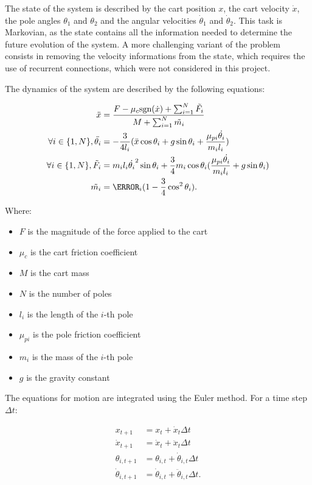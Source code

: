 The state of the system is described by the cart position $x$, the cart velocity $\dot{x}$, the pole angles $\theta_1$ and $\theta_2$ and the angular velocities $\dot{\theta}_1$ and $\dot{\theta}_2$.
This task is Markovian, as the state contains all the information needed to determine the future evolution of the system.
A more challenging variant of the problem consists in removing the velocity informations from the state, which requires the use of recurrent connections, which were not considered
in this project.

The dynamics of the system are described by the following equations:

\[
    \begin{aligned}
        \ddot{x} &= \frac{F - \mu_c \text{sgn}(\dot{x}) + \sum_{i = 1}^N \tilde{F_i}}{M + \sum_{i = 1}^N \tilde{m_i}} \\
        \forall i \in \{1, N\}, \ddot{\theta_i} &= - \frac{3}{4 l_i} (\ddot{x} \cos \theta_i + g \sin \theta_i + \frac{\mu_{pi} \dot{\theta_i}}{m_i l_i})\\
        \forall i \in \{1, N\}, \tilde{F_i} &= m_i l_i \dot{\theta_i}^2 \sin \theta_i + \frac{3}{4} m_i \cos \theta_i (\frac{\mu_{pi} \dot{\theta_i}}{m_i l_i} + g \sin \theta_i) \\
        \tilde{m_i} &= \m_i (1 - \frac{3}{4} \cos^2 \theta_i). \\
    \end{aligned}
\]

Where:

\begin{itemize}
    \item $F$ is the magnitude of the force applied to the cart
    \item $\mu_c$ is the cart friction coefficient
    \item $M$ is the cart mass
    \item $N$ is the number of poles
    \item $l_i$ is the length of the $i$-th pole
    \item $\mu_{pi}$ is the pole friction coefficient
    \item $m_i$ is the mass of the $i$-th pole
    \item $g$ is the gravity constant
\end{itemize}

The equations for motion are integrated using the Euler method. For a time step $\Delta t$:

\[
    \begin{aligned}
        x_{t+1} &= x_t + \dot{x}_t \Delta t \\
        \dot{x}_{t+1} &= \dot{x}_t + \ddot{x}_t \Delta t \\
        \theta_{i, t+1} &= \theta_{i, t} + \dot{\theta}_{i, t} \Delta t \\
        \dot{\theta}_{i, t+1} &= \dot{\theta}_{i, t} + \ddot{\theta}_{i, t} \Delta t. \\
    \end{aligned}
\]

